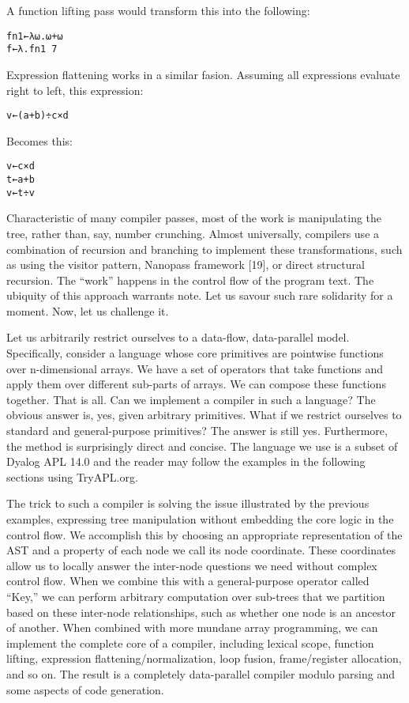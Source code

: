 \documentclass[pldi]{sigplanconf-pldi15}
\begin{document}
A function lifting pass would transform this into the following:

\begin{verbatim}
fn1←λ⍵.⍵+⍵
f←λ.fn1 7
\end{verbatim}

Expression flattening works in a similar fasion. Assuming all expressions evaluate right to left, this expression:

\begin{verbatim}
v←(a+b)÷c×d
\end{verbatim}

Becomes this:

\begin{verbatim}
v←c×d
t←a+b
v←t÷v
\end{verbatim}

Characteristic of many compiler passes, most of the work is manipulating the tree, rather than, say, number 
crunching. Almost universally, compilers use a combination of recursion and branching to implement these 
transformations, such as using the visitor pattern, Nanopass framework [19], or direct structural recursion. 
The “work” happens in the control flow of the program text. The ubiquity of this approach warrants note. 
Let us savour such rare solidarity for a moment. Now, let us challenge it. 

Let us arbitrarily restrict ourselves to a data-flow, data-parallel model. Specifically, consider a language 
whose core primitives are pointwise functions over n-dimensional arrays. We have a set of operators that 
take functions and apply them over different sub-parts of arrays. We can compose these functions together. 
That is all. Can we implement a compiler in such a language? The obvious answer is, yes, given arbitrary 
primitives. What if we restrict ourselves to standard and general-purpose primitives? The answer is still 
yes. Furthermore, the method is surprisingly direct and concise. The language we use is a subset of Dyalog 
APL 14.0 and the reader may follow the examples in the following sections using TryAPL.org. 

The trick to such a compiler is solving the issue illustrated by the previous examples, expressing tree 
manipulation without embedding the core logic in the control flow. We accomplish this by choosing an 
appropriate representation of the AST and a property of each node we call its node coordinate. These 
coordinates allow us to locally answer the inter-node questions we need without complex control flow. When 
we combine this with a general-purpose operator called “Key,” we can perform arbitrary computation over 
sub-trees that we partition based on these inter-node relationships, such as whether one node is an ancestor 
of another. When combined with more mundane array programming, we can implement the complete core of a 
compiler, including lexical scope, function lifting, expression flattening/normalization, loop fusion, 
frame/register allocation, and so on. The result is a completely data-parallel compiler modulo parsing and 
some aspects of code generation.
\end{document}
